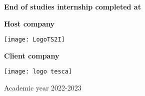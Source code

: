 \vspace{10pt}
\begin{center}

\textbf{End of studies internship completed at}

\end{center}
\vspace{4 pt}
\begin{center}
\noindent
\begin{minipage}{0.2\linewidth}
    \textbf{Host company}
\end{minipage}
\hspace{10pt}
\begin{minipage}{0.2\linewidth}
\vspace{-3pt}
    \texttt{[image: LogoTS2I]}
\end{minipage}
\end{center}

\begin{center}
\noindent
\hspace{-5pt}
\begin{minipage}{0.2\linewidth}
    \textbf{Client company}
\end{minipage}
\hspace{5pt}
\begin{minipage}{0.2\linewidth}
\vspace{-3pt}
    \texttt{[image: logo tesca]}
\end{minipage}
\end{center}
\vspace{10pt}
\begin{center}
Academic year 2022-2023
\end{center}
%